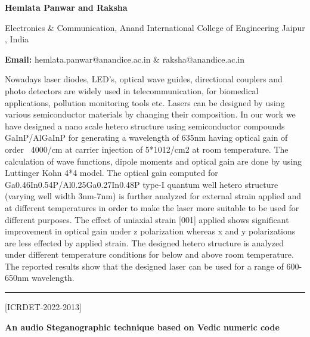 \documentclass[twoside,11pt]{amsart}
\begin{document}
\centerline{\textbf{Hemlata Panwar and Raksha  }}
\vskip 5mm
\begin{flushleft}
Electronics \& Communication, Anand International College of Engineering Jaipur , India
\vskip 5mm
\end{flushleft}
\vskip 2mm
\begin{flushleft}
{\bf Email:} hemlata.panwar@anandice.ac.in \& raksha@anandice.ac.in
\end{flushleft}
\vskip 5mm
Nowadays laser diodes, LED’s, optical wave guides, directional couplers and photo detectors are widely used in telecommunication, for biomedical applications, pollution monitoring tools etc. Lasers can be designed by using various semiconductor materials by changing their composition. In our work we have designed a nano scale hetero structure using semiconductor compounds GaInP/AlGaInP for generating a wavelength of 635nm having optical gain of order ~4000/cm at carrier injection of 5*1012/cm2 at room temperature. The calculation of wave functions, dipole moments and optical gain are done by using Luttinger Kohn 4*4 model. The optical gain computed for Ga0.46In0.54P/Al0.25Ga0.27In0.48P type-I quantum well hetero structure (varying well width 3nm-7nm) is further analyzed for external strain applied and at different temperatures in order to make the laser more suitable to be used for different purposes. The effect of uniaxial strain [001] applied shows significant improvement in optical gain under z polarization whereas x and y polarizations are less effected by applied strain. The designed hetero structure is analyzed under different temperature conditions for below and above room temperature. The reported results show that the designed laser can be used for a range of 600-650nm wavelength.
\vskip 2mm
\rule{\textwidth}{0.5pt}

\vskip 5mm
\begin{flushleft}
\centerline{[ICRDET-2022-2013]}
\end{flushleft}
\begin{center}\bf\LARGE
An audio Steganographic technique based on Vedic numeric code
\end{center}
\vskip 5mm
\end{document}
